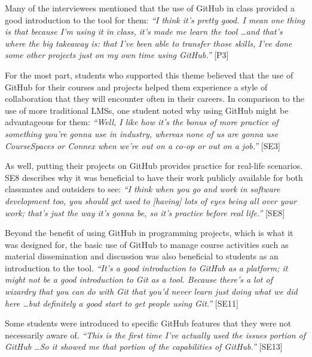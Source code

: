 Many of the interviewees mentioned that the use of GitHub in class provided a good introduction to the tool for them: \textit{``I think it's pretty good. I mean one thing is that because I'm using it in class, it's made me learn the tool \ldots and that's where the big takeaway is: that I've been able to transfer those skills, I've done some other projects just on my own time using GitHub.''} [P3]


For the most part, students who supported this theme believed that the use of GitHub for their courses and projects helped them experience a style of collaboration that they will encounter often in their careers. In comparison to the use of more traditional LMSs, one student noted why using GitHub might be advantageous for them: \textit{``Well, I like how it's the bonus of more practice of something you're gonna use in industry, whereas none of us are gonna use CourseSpaces or Connex when we're out on a co-op or out on a job.''} [SE3]

As well, putting their projects on GitHub provides practice for real-life scenarios. SE8 describes why it was beneficial to have their work publicly available for both classmates and outsiders to see: \textit{``I think when you go and work in software development too, you should get used to [having] lots of eyes being all over your work; that's just the way it's gonna be, so it's practice before real life.''} [SE8]

Beyond the benefit of using GitHub in programming projects, which is what it was designed for, the basic use of GitHub to manage course activities such as material dissemination and discussion was also beneficial to students as an introduction to the tool. \textit{``It's a good introduction to GitHub as a platform; it might not be a good introduction to Git as a tool. Because there's a lot of wizardry that you can do with Git that you'd never learn just doing what we did here \ldots but definitely a good start to get people using Git.''} [SE11]

Some students were introduced to specific GitHub features that they were not necessarily aware of. \textit{``This is the first time I've actually used the issues portion of GitHub \ldots So it showed me that portion of the capabilities of GitHub.''} [SE13]

